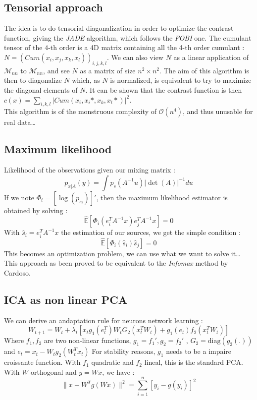 \documentclass[a4paper,11pt,titlepage]{article}
\begin{document}
\subsection{Tensorial approach}
The idea is to do tensorial diagonalization in order to optimize the contrast function, giving the \textit{JADE} algorithm, which follows the \textit{FOBI} one. The cumulant tensor of the $4$-th order is a 4D matrix containing all the 4-th order cumulant :$N =(Cum(x_i,x_j,x_k,x_l))_{i,j,k,l}$. We can also view $N$ as a linear application of $\mathcal{M}_{nn}$ to $\mathcal{M}_{nn}$, and see $N$ as a matrix of size $n^2 \times n^2$.
The aim of this algorithm is then to diagonalize $N$ which, as $N$ is normalized, is equivalent to try to maximize the diagonal elements of $N$. It can be shown that the contrast function is then $c(x) =\sum\limits_{i,k,l} |Cum(x_i,x_i*,x_k,x_l*)|^2$.\\
This algorithm is of the monstruous complexity of $\mathcal{O}(n^4)$, and thus unusable for real data\dots

\subsection{Maximum likelihood}
Likelihood of the observations given our mixing matrix :
\begin{equation*}
	p_{x|A}(y) = \int p_s(A^{-1}u)|\det(A)|^{-1}du
\end{equation*}
If we note $\Phi_i = [\log(p_{s_i})]'$, then the maximum likelihood estimator is obtained by solving :
\begin{equation*}
	\hat{\mathds{E}}[\Phi_i(e_i^TA^{-1}x)e_j^TA^{-1}x] = 0
\end{equation*}
With $\hat{s}_i= e_i^TA^{-1}x$ the estimation of our sources, we get the simple condition :
\begin{equation*}
	\hat{\mathds{E}}[\Phi_i(\hat{s}_i)\hat{s}_j] = 0
\end{equation*}
This becomes an optimization problem, we can use what we want to solve it\dots
This approach as been proved to be equivalent to the \textit{Infomax} method by Cardoso.


\subsection{ICA as non linear PCA}
We can derive an andaptation rule for neurons network learning :
\begin{equation*}
	W_{t+1} = W_t +\lambda_t [x_t g_1(e_t^T)W_t G_2(x_t^TW_t)+ g_1(e_t)f_2(x_t^TW_t)]
\end{equation*}
Where $f_1,f_2$ are two non-linear functions, $g_1 = f_1',g_2=f_2'$ , $G_2 = \text{diag}(g_2(.))$ and $e_t = x_t-W_tg_2(W_t^Tx_t)$
For stability reasons, $g_1$ needs to be a impaire croissante function. With $f_1$ quadratic and $f_2$ lineal, this is the standard PCA.\\
With $W$ orthogonal and $y=Wx$, we have :
\begin{equation*}
	\| x-W^Tg(Wx) \|^2 = \sum\limits_{i=1}^n [y_i-g(y_i)]^2
\end{equation*}
\end{document}
